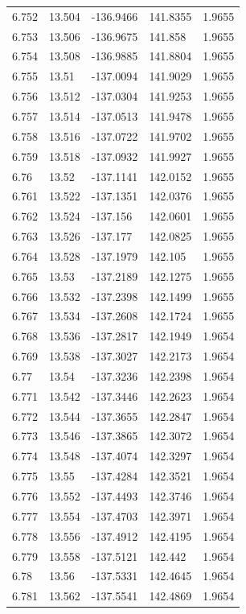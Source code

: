 \begin{tabular}{lllll}
6.752 & 13.504 & -136.9466 & 141.8355 & 1.9655 \\
6.753 & 13.506 & -136.9675 & 141.858 & 1.9655 \\
6.754 & 13.508 & -136.9885 & 141.8804 & 1.9655 \\
6.755 & 13.51 & -137.0094 & 141.9029 & 1.9655 \\
6.756 & 13.512 & -137.0304 & 141.9253 & 1.9655 \\
6.757 & 13.514 & -137.0513 & 141.9478 & 1.9655 \\
6.758 & 13.516 & -137.0722 & 141.9702 & 1.9655 \\
6.759 & 13.518 & -137.0932 & 141.9927 & 1.9655 \\
6.76 & 13.52 & -137.1141 & 142.0152 & 1.9655 \\
6.761 & 13.522 & -137.1351 & 142.0376 & 1.9655 \\
6.762 & 13.524 & -137.156 & 142.0601 & 1.9655 \\
6.763 & 13.526 & -137.177 & 142.0825 & 1.9655 \\
6.764 & 13.528 & -137.1979 & 142.105 & 1.9655 \\
6.765 & 13.53 & -137.2189 & 142.1275 & 1.9655 \\
6.766 & 13.532 & -137.2398 & 142.1499 & 1.9655 \\
6.767 & 13.534 & -137.2608 & 142.1724 & 1.9655 \\
6.768 & 13.536 & -137.2817 & 142.1949 & 1.9654 \\
6.769 & 13.538 & -137.3027 & 142.2173 & 1.9654 \\
6.77 & 13.54 & -137.3236 & 142.2398 & 1.9654 \\
6.771 & 13.542 & -137.3446 & 142.2623 & 1.9654 \\
6.772 & 13.544 & -137.3655 & 142.2847 & 1.9654 \\
6.773 & 13.546 & -137.3865 & 142.3072 & 1.9654 \\
6.774 & 13.548 & -137.4074 & 142.3297 & 1.9654 \\
6.775 & 13.55 & -137.4284 & 142.3521 & 1.9654 \\
6.776 & 13.552 & -137.4493 & 142.3746 & 1.9654 \\
6.777 & 13.554 & -137.4703 & 142.3971 & 1.9654 \\
6.778 & 13.556 & -137.4912 & 142.4195 & 1.9654 \\
6.779 & 13.558 & -137.5121 & 142.442 & 1.9654 \\
6.78 & 13.56 & -137.5331 & 142.4645 & 1.9654 \\
6.781 & 13.562 & -137.5541 & 142.4869 & 1.9654 \\

\end{tabular}
